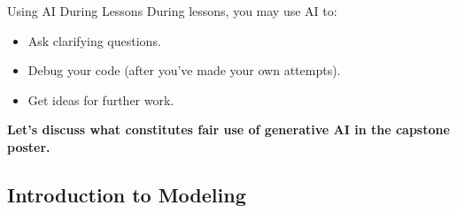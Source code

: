 \begin{frame}{Using AI During Lessons}
    \Large 
    During lessons, you may use AI to:
    
    \begin{itemize}
        \item Ask clarifying questions. 
        \item Debug your code (after you've made your own attempts). 
        \item Get ideas for further work. 
    \end{itemize}
    
    \vspace{0.5cm}
    
    \begin{center}
        \textbf{Let's discuss what constitutes fair use of generative AI in the capstone poster.} 
    \end{center}
\end{frame}

\subsection{Introduction to Modeling}

